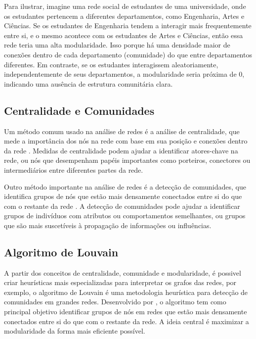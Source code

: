 Para ilustrar, imagine uma rede social de estudantes de uma universidade, onde os estudantes pertencem a diferentes departamentos, como Engenharia, Artes e Ciências. Se os estudantes de Engenharia tendem a interagir mais frequentemente entre si, e o mesmo acontece com os estudantes de Artes e Ciências, então essa rede teria uma alta modularidade. Isso porque há uma densidade maior de conexões dentro de cada departamento (comunidade) do que entre departamentos diferentes. Em contraste, se os estudantes interagissem aleatoriamente, independentemente de seus departamentos, a modularidade seria próxima de 0, indicando uma ausência de estrutura comunitária clara.

\subsection*{Centralidade e Comunidades}

Um método comum usado na análise de redes é a análise de centralidade, que mede a importância dos nós na rede com base em sua posição e conexões dentro da rede \cite[]{1978_Freeman}. Medidas de centralidade podem ajudar a identificar atores-chave na rede, ou nós que desempenham papéis importantes como porteiros, conectores ou intermediários entre diferentes partes da rede.

Outro método importante na análise de redes é a detecção de comunidades, que identifica grupos de nós que estão mais densamente conectados entre si do que com o restante da rede \cite[]{2004_Newman}. A detecção de comunidades pode ajudar a identificar grupos de indivíduos com atributos ou comportamentos semelhantes, ou grupos que são mais suscetíveis à propagação de informações ou influências.

\subsection*{Algoritmo de Louvain}

A partir dos conceitos de centralidade, comunidade e modularidade, é possivel criar heurísticas mais especializadas para interpretar os grafos das redes, por exemplo, o algoritmo de Louvain é uma metodologia heurística para detecção de comunidades em grandes redes. Desenvolvido por , o algoritmo tem como principal objetivo identificar grupos de nós em redes que estão mais densamente conectados entre si do que com o restante da rede. A ideia central é maximizar a modularidade da forma mais eficiente possível.

